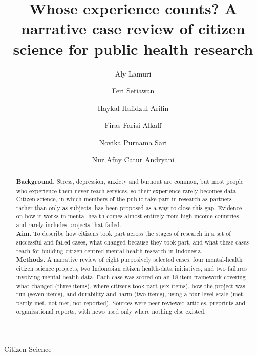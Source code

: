 \documentclass[
  number,
  preprint]{elsarticle}
\begin{document}
\begin{frontmatter}
\title{Whose experience counts? A narrative case review of citizen
science for public health research}
\author[1,2]{Aly Lamuri%
%
}
\author[3]{Feri Setiawan%
%
}

\author[1,5]{Haykal Hafidzul Arifin%
%
}

\author[4]{Firas Farisi Alkaff%
%
}

\author[2]{Novika Purnama Sari%
%
}

\author[3]{Nur Afny Catur Andryani%
%
}









        
\begin{abstract}
\textbf{Background.} Stress, depression, anxiety and burnout are common,
but most people who experience them never reach services, so their
experience rarely becomes data. Citizen science, in which members of the
public take part in research as partners rather than only as subjects,
has been proposed as a way to close this gap. Evidence on how it works
in mental health comes almost entirely from high-income countries and
rarely includes projects that failed.\\
\textbf{Aim.} To describe how citizens took part across the stages of
research in a set of successful and failed cases, what changed because
they took part, and what these cases teach for building citizen-centred
mental health research in Indonesia.\\
\textbf{Methods.} A narrative review of eight purposively selected
cases: four mental-health citizen science projects, two Indonesian
citizen health-data initiatives, and two failures involving
mental-health data. Each case was scored on an 18-item framework
covering what changed (three items), where citizens took part (six
items), how the project was run (seven items), and durability and harm
(two items), using a four-level scale (met, partly met, not met, not
reported). Sources were peer-reviewed articles, preprints and
organisational reports, with news used only where nothing else existed.
\end{abstract}





\begin{keyword}
    
    Citizen Science
\end{keyword}
\end{frontmatter}
    
\end{document}
